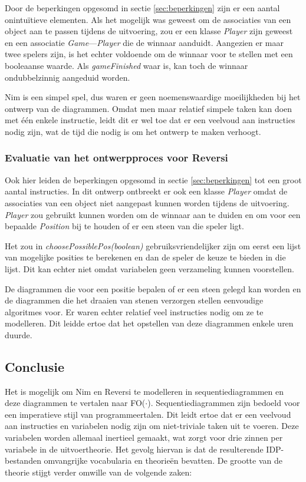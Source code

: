 Door de beperkingen opgesomd in sectie \ref{sec:beperkingen} zijn er een aantal onintu\"itieve elementen. Als het mogelijk was geweest om de associaties van een object aan te passen tijdens de uitvoering, zou er een klasse \textit{Player} zijn geweest en een associatie \textit{Game}---\textit{Player} die de winnaar aanduidt. Aangezien er maar twee spelers zijn, is het echter voldoende om de winnaar voor te stellen met een booleaanse waarde. Als \textit{gameFinished} waar is, kan toch de winnaar ondubbelzinnig aangeduid worden.

Nim is een simpel spel, dus waren er geen noemenswaardige moeilijkheden bij het ontwerp van de diagrammen. Omdat men maar relatief simpele taken kan doen met \'e\'en enkele instructie, leidt dit er wel toe dat er een veelvoud aan instructies nodig zijn, wat de tijd die nodig is om het ontwerp te maken verhoogt.

\subsubsection{Evaluatie van het ontwerpproces voor Reversi}

Ook hier leiden de beperkingen opgesomd in sectie \ref{sec:beperkingen} tot een groot aantal instructies. In dit ontwerp ontbreekt er ook een klasse \textit{Player} omdat de associaties van een object niet aangepast kunnen worden tijdens de uitvoering. \textit{Player} zou gebruikt kunnen worden om de winnaar aan te duiden en om voor een bepaalde \textit{Position} bij te houden of er een steen van die speler ligt.

Het zou in \textit{choosePossiblePos(boolean)} gebruiksvriendelijker zijn om eerst een lijst van mogelijke posities te berekenen en dan de speler de keuze te bieden in die lijst. Dit kan echter niet omdat variabelen geen verzameling kunnen voorstellen.

De diagrammen die voor een positie bepalen of er een steen gelegd kan worden en de diagrammen die het draaien van stenen verzorgen stellen eenvoudige algoritmes voor. Er waren echter relatief veel instructies nodig om ze te modelleren. Dit leidde ertoe dat het opstellen van deze diagrammen enkele uren duurde.

\subsection{Conclusie}\label{sec:design-conclusion}

Het is mogelijk om Nim en Reversi te modelleren in sequentiediagrammen en deze diagrammen te vertalen naar FO($\cdot$). Sequentiediagrammen zijn bedoeld voor een imperatieve stijl van programmeertalen. Dit leidt ertoe dat er een veelvoud aan instructies en variabelen nodig zijn om niet-triviale taken uit te voeren. Deze variabelen worden allemaal inertieel gemaakt, wat zorgt voor drie zinnen per variabele in de uitvoertheorie. Het gevolg hiervan is dat de resulterende IDP-bestanden omvangrijke vocabularia en theorie\"en bevatten. De grootte van de theorie stijgt verder omwille van de volgende zaken:


